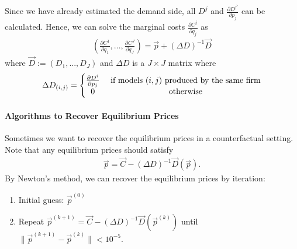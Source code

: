 \documentclass[11pt]{elegantbook}
\begin{document}
Since we have already estimated the demand side, all $D^j$ and $\frac{\partial D^{j'}}{\partial p_j}$ can be calculated. Hence, we can solve the marginal costs $\frac{\partial C^{j}}{\partial q_{j}}$ as
\begin{equation}
    \begin{aligned}
        \left(\frac{\partial C^{1}}{\partial q_{1}},...,\frac{\partial C^{J}}{\partial q_{J}}\right)=\vec{p}+(\Delta D)^{-1}\vec{D}
    \end{aligned}
    \nonumber
\end{equation}
where $\vec{D}:=\left(D_1,...,D_J\right)$ and $\Delta D$ is a $J\times J$ matrix where
\begin{equation}
    \begin{aligned}
        \Delta D_{(i,j)}=
        \left\{\begin{matrix}
            \frac{\partial D^{i}}{\partial p_j}& \textnormal{ if models $(i,j)$ produced by the same firm}\\
            0& \textnormal{ otherwise}
        \end{matrix}\right.
    \end{aligned}
    \nonumber
\end{equation}

\paragraph*{Algorithms to Recover Equilibrium Prices}
Sometimes we want to recover the equilibrium prices in a counterfactual setting. Note that any equilibrium prices should satisfy
\begin{equation}
    \begin{aligned}
        \vec{p}=\vec{C}-(\Delta D)^{-1}\vec{D}(\vec{p}).
    \end{aligned}
    \nonumber
\end{equation}
By Newton's method, we can recover the equilibrium prices by iteration:
\begin{enumerate}
    \item Initial guess: $\vec{p}^{(0)}$
    \item Repeat $\vec{p}^{(k+1)}=\vec{C}-(\Delta D)^{-1}\vec{D}(\vec{p}^{(k)})$ until $\|\vec{p}^{(k+1)}-\vec{p}^{(k)}\|<10^{-5}$.
\end{enumerate}
\end{document}
